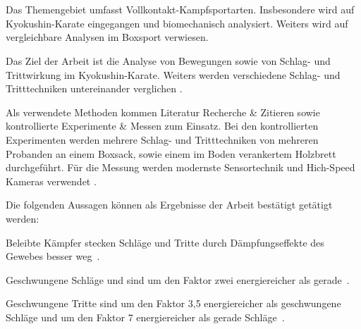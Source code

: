 
%
\section*{\thesisheading}



 Das Themengebiet umfasst Vollkontakt-Kampfsportarten.
Insbesondere wird auf Kyokushin-Karate eingegangen und biomechanisch
analysiert. Weiters wird auf vergleichbare Analysen im Boxsport verwiesen.

 Das Ziel der Arbeit ist die Analyse von Bewegungen
sowie von Schlag- und Trittwirkung im Kyokushin-Karate. Weiters werden
verschiedene Schlag- und Tritttechniken untereinander verglichen
\cite[Kap.~4,~S.~6f]{Fraunschiel2008}.

 Als verwendete Methoden kommen Literatur
Recherche \& Zitieren sowie kontrollierte Experimente \& Messen zum Einsatz.
Bei den kontrollierten Experimenten werden mehrere Schlag- und Tritttechniken
von mehreren Probanden an einem Boxsack, sowie einem im Boden verankertem
Holzbrett durchgeführt. Für die Messung werden modernste Sensortechnik und
Hich-Speed Kameras verwendet \cite[Kap.~8,~S.~54ff]{Fraunschiel2008}.

Die folgenden Aussagen können als Ergebnisse der Arbeit bestätigt getätigt
werden:
\begin{itemize*}
    \item Beleibte Kämpfer stecken Schläge und Tritte durch Dämpfungseffekte
          des Gewebes besser weg~\cite[99]{Fraunschiel2008}.
    \item Geschwungene Schläge und sind um den Faktor zwei energiereicher als
          gerade~\cite[100]{Fraunschiel2008}.
    \item Geschwungene Tritte sind um den Faktor 3,5 energiereicher als
          geschwungene Schläge und um den Faktor 7 energiereicher als gerade
          Schläge~\cite[100]{Fraunschiel2008}.
\end{itemize*}

%
\section*{\thesisheading}

